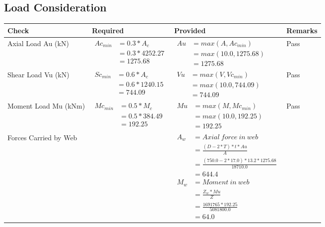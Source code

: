 \documentclass{article}%
\begin{document}
%
\newpage%
\subsection{Load Consideration}%
\label{subsec:LoadConsideration}%
\renewcommand{\arraystretch}{1.2}%
\begin{longtable}{|p{4cm}|p{5cm}|p{5.5cm}|p{1.5cm}|}%
\hline%
\rowcolor{OsdagGreen}%
Check&Required&Provided&Remarks\\%
\hline%
\endhead%
\hline%
Axial Load Au (kN)&$\begin{aligned} Ac_{min} &= 0.3 * A_c\\ &= 0.3 *4252.27\\ &=1275.68\end{aligned}$&$\begin{aligned} Au &= max(A,Ac_{min} )\\ &= max( 10.0,1275.68)\\ &=1275.68\end{aligned}$&Pass\\%
\hline%
Shear Load Vu (kN)&$\begin{aligned} Sc_{min} &= 0.6 * A_c\\ &= 0.6 *1240.15\\ &=744.09\end{aligned}$&$\begin{aligned} Vu &= max(V,Vc_{min})\\ &=  max(10.0,744.09)\\ &=744.09\end{aligned}$&Pass\\%
\hline%
Moment Load Mu (kNm)&$\begin{aligned} Mc_{min} &= 0.5 * M_c\\ &= 0.5 *384.49\\ &=192.25\end{aligned}$&$\begin{aligned} Mu &= max(M,Mc_{min} )\\ &= max(10.0,192.25)\\ &=192.25\end{aligned}$&Pass\\%
\hline%
Forces Carried by Web&&$\begin{aligned}A_w &= Axial~ force~ in~ web  \\   &= \frac{(D- 2*T)*t* Au }{A} \\ &= \frac{(750.0- 2*17.0)*13.2*1275.68 }{18710.0} \\ &=644.4\\ M_w &= Moment ~in ~web  \\  &= \frac{Z_w * Mu}{Z} \\ &= \frac{1691765 * 192.25}{5081800.0} \\ &=64.0\end{aligned}$&\\%

\end{longtable}
\end{document}
